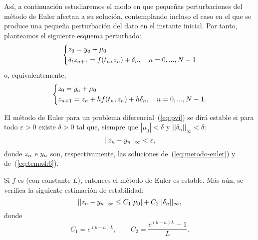 Así, a continuación estudiaremos el modo en que pequeñas perturbaciones
del método de Euler afectan a su solución, contemplando incluso
el caso en el que se produce una pequeña perturbación del dato en el
instante inicial. Por tanto, planteamos el siguiente esquema
perturbado:
\begin{equation}\left\{
\begin{aligned}
  &z_0 = {y_a} + \mu_0 \\
  &\delta_t {z_{n+1}} = f({t_n},{z_n}) + \delta_n,\quad n=0,...,N-1
\end{aligned}\right.
\label{eq:metodo-euler-perturbado}
\end{equation}
o, equivalentemente,
\begin{equation}
\left\{
\begin{aligned}
  &z_0 = {y_a} + \mu_0 \\
  &{z_{n+1}} = {z_n} + h f({t_n},{z_n}) + h \delta_n,\quad n=0,...,N-1.
\end{aligned}
\right.
\label{eq:tema4:6}
\end{equation}

\begin{definition}
  \label{def:estabilidad}
  El método de Euler para un problema diferencial~(\ref{eq:pvi}) se
  dirá estable si para todo $\varepsilon>0$ existe $\delta>0$ tal que,
  siempre que $|\mu_0|<\delta$ y $||\delta_n||_\infty<\delta$:
  \begin{equation*}
    ||{z_n} - {y_n}||_\infty<\varepsilon,
  \end{equation*}
  donde ${z_n}$ e ${y_n}$ son, respectivamente, las soluciones
  de~(\ref{eq:metodo-euler}) y de~(\ref{eq:tema4:6}).
\end{definition}

\begin{theorem}
  \label{thm:estabilidad-euler}
  Si $f$ es \globLipschitz (con constante $L$), entonces el método de
  Euler es estable. Más aún, se verifica la siguiente estimación de
  estabilidad:
  \begin{equation*}
    ||{z_n} - {y_n}||_\infty \le C_1|\mu_0| + C_2 ||\delta_n||_\infty,
  \end{equation*}
  donde
  \begin{equation}
    \label{eq:euler-ctes-estimacion-estabilidad}
    C_1=e^{(b-a)L}, \qquad C_2=\frac{e^{(b-a)L}-1}{L}.
  \end{equation}
\end{theorem}

